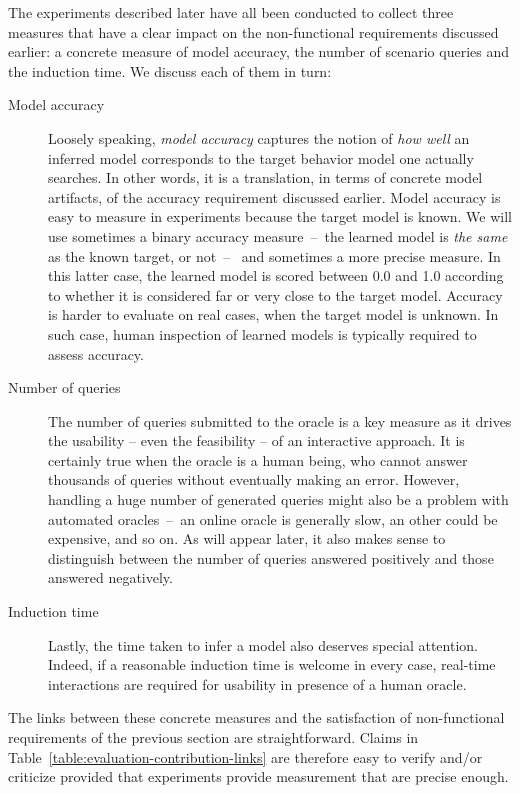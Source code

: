 The experiments described later have all been conducted to collect three measures that have a clear impact on the non-functional requirements discussed earlier: a concrete measure of model accuracy, the number of scenario queries and the induction time. We discuss each of them in turn:

\begin{description}

\item[Model accuracy] Loosely speaking, \emph{model accuracy} captures the notion of \emph{how well} an inferred model corresponds to the target behavior model one actually searches. In other words, it is a translation, in terms of concrete model artifacts, of the accuracy requirement discussed earlier. Model accuracy is easy to measure in experiments because the target model is known. We will use sometimes a binary accuracy measure~--~the learned model is \emph{the same} as the known target, or not~--~ and sometimes a more precise measure. In this latter case, the learned model is scored between 0.0 and 1.0 according to whether it is considered far or very close to the target model. Accuracy is harder to evaluate on real cases, when the target model is unknown. In such case, human inspection of learned models is typically required to assess accuracy.

\item[Number of queries] The number of queries submitted to the oracle is a key measure as it drives the usability -- even the feasibility -- of an interactive approach. It is certainly true when the oracle is a human being, who cannot answer thousands of queries without eventually making an error. However, handling a huge number of generated queries might also be a problem with automated oracles~--~an online oracle is generally slow, an other could be expensive, and so on. As will appear later, it also makes sense to distinguish between the number of queries answered positively and those answered negatively.

\item[Induction time] Lastly, the time taken to infer a model also deserves special attention. Indeed, if a reasonable induction time is welcome in every case, real-time interactions are required for usability in presence of a human oracle.

\end{description}

The links between these concrete measures and the satisfaction of non-functional requirements of the previous section are straightforward. Claims in Table~\ref{table:evaluation-contribution-links} are therefore easy to verify and/or criticize provided that experiments provide measurement that are precise enough. 

